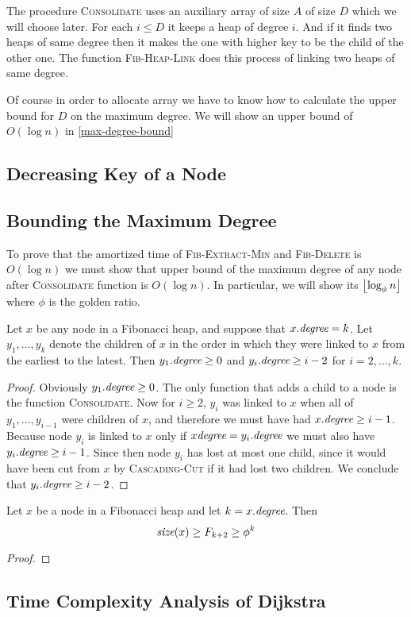 The procedure \textsc{Consolidate} uses an auxiliary array of size $A$ of size $D$ which we will choose later. For each $i\leq D$ it keeps a heap of degree $i$. And if it finds two heaps of same degree then it makes the one with higher key to be the child of the other one. The function \textsc{Fib-Heap-Link} does this process of linking two heaps of same degree.

Of course in order to allocate array we have to know how to calculate the upper bound for $D$ on the maximum degree. We will show an upper bound of $O(\log n)$ in \autoref{max-degree-bound}


\subsection{Decreasing Key of a Node}

\subsection{Bounding the Maximum Degree}\label{max-degree-bound}
To prove that the amortized time of \textsc{Fib-Extract-Min} and \textsc{Fib-Delete} is $O(\log n)$ we must show that upper bound of the maximum degree of any node after \textsc{Consolidate} function is $O(\log n)$. In particular, we will show its $\left\lfloor \log_{\phi}n\right\rfloor$ where $\phi$ is the golden ratio.
\begin{lemma}{}{}
Let $x$ be any node in a Fibonacci heap, and suppose that $x.\emph{degree}=k$. Let $y_1,\dots, y_k$ denote the children of $x$ in the order in which they were linked to $x$ from the earliest to the latest. Then $y_1.\emph{degree}\geq 0$ and $y_i.\emph{degree}\geq i-2$ for $i=2,\dots, k$.
\end{lemma}
\begin{proof}
	Obviously $y_1.\emph{degree}\geq 0$. The only function that adds a child to a node is the function \textsc{Consolidate}. Now for $i\geq 2$, $y_i$ was linked to $x$ when all of $y_1,\dots, y_{i-1}$ were children of $x$, and therefore we must have had $x.\emph{degree}\geq i-1$. Because node $y_i$ is linked to $x$ only if $x\emph{degree}=y_i.\emph{degree}$ we must also have $y_i.\emph{degree}\geq i-1$. Since then node $y_i$ has lost at most one child, since it would have been cut from $x$ by \textsc{Cascading-Cut} if it had lost two children. We conclude that $y_i.\emph{degree}\geq i-2$. 
\end{proof}
\begin{lemma}{}{}
Let $x$ be a node in a Fibonacci heap and let $k=x.\emph{degree}$. Then $$\emph{size}(x)\geq F_{k+2}\geq \phi^k$$
\end{lemma}
\begin{proof}

\end{proof}
\subsection{Time Complexity Analysis of Dijkstra}

